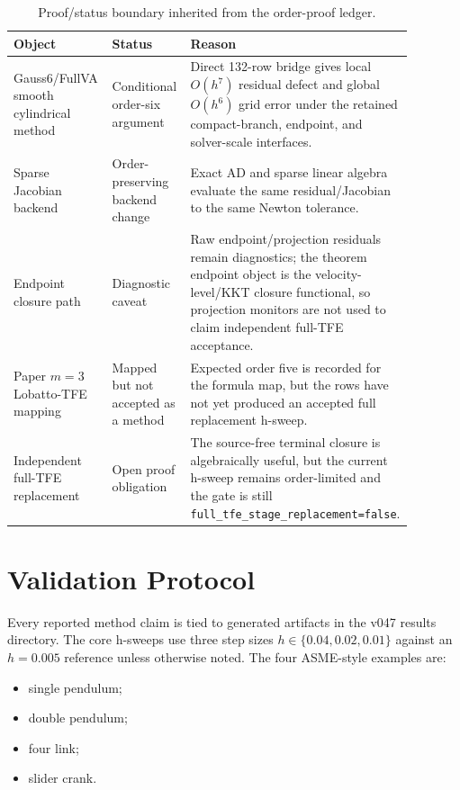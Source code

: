 \documentclass[11pt]{article}
\newcommand{\method}{Gauss6/FullVA}
\newcommand{\tfe}{TFE}
\begin{document}
\begin{table}[t]
\centering
\caption{Proof/status boundary inherited from the order-proof ledger.}
\label{tab:proof-status}
\begin{tabular}{P{0.29\linewidth}P{0.22\linewidth}P{0.37\linewidth}}
\toprule
Object & Status & Reason \\
\midrule
\method{} smooth cylindrical method &
Conditional order-six argument &
Direct 132-row bridge gives local \(O(h^7)\) residual defect and global
\(O(h^6)\) grid error under the retained compact-branch, endpoint, and
solver-scale interfaces. \\
Sparse Jacobian backend &
Order-preserving backend change &
Exact AD and sparse linear algebra evaluate the same residual/Jacobian to the
same Newton tolerance. \\
Endpoint closure path &
Diagnostic caveat &
Raw endpoint/projection residuals remain diagnostics; the theorem endpoint
object is the velocity-level/KKT closure functional, so projection monitors are
not used to claim independent full-\tfe{} acceptance. \\
Paper $m=3$ Lobatto-\tfe{} mapping &
Mapped but not accepted as a method &
Expected order five is recorded for the formula map, but the rows have not yet
produced an accepted full replacement h-sweep. \\
Independent full-\tfe{} replacement &
Open proof obligation &
The source-free terminal closure is algebraically useful, but the current
h-sweep remains order-limited and the gate is still
\nolinkurl{full_tfe_stage_replacement=false}. \\
\bottomrule
\end{tabular}
\end{table}

\section{Validation Protocol}

Every reported method claim is tied to generated artifacts in the v047 results
directory.  The core h-sweeps use
three step sizes $h\in\{0.04,0.02,0.01\}$ against an $h=0.005$ reference unless
otherwise noted.  The four ASME-style examples are:
\begin{itemize}
  \item single pendulum;
  \item double pendulum;
  \item four link;
  \item slider crank.
\end{itemize}
\end{document}
